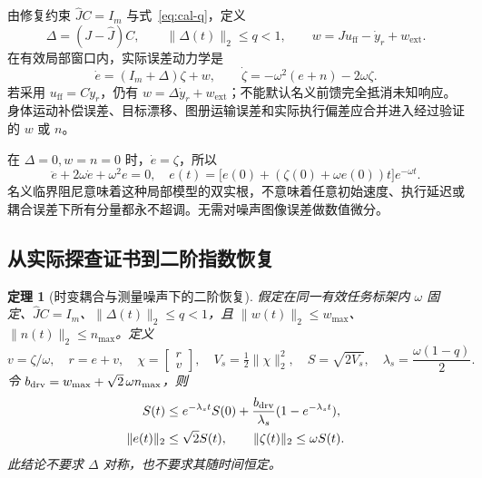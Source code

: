 \documentclass[11pt,a4paper]{article}
\numberwithin{equation}{section}
\newtheorem{theorem}{定理}[section]
\theoremstyle{definition}
\begin{document}
由修复约束 $\widehat JC=I_m$ 与式~\eqref{eq:cal-q}，定义
\begin{equation}
 \Delta=(J-\widehat J)C,\qquad
 \|\Delta(t)\|_2\le q<1,
 \qquad
 w=Ju_{\mathrm{ff}}-\dot y_r+w_{\mathrm{ext}}.
 \label{eq:cal-feedback-residual}
\end{equation}
在有效局部窗口内，实际误差动力学是
\begin{equation}
 \boxed{\dot e=(I_m+\Delta)\zeta+w,\qquad
 \dot\zeta=-\omega^2(e+n)-2\omega\zeta.}
 \label{eq:cal-error-dynamics}
\end{equation}
若采用 $u_{\mathrm{ff}}=C\dot y_r$，仍有 $w=\Delta\dot y_r+w_{\mathrm{ext}}$；不能默认名义前馈完全抵消未知响应。身体运动补偿误差、目标漂移、图册运输误差和实际执行偏差应合并进入经过验证的 $w$ 或 $n$。

在 $\Delta=0,w=n=0$ 时，$\dot e=\zeta$，所以
\begin{equation}
 \ddot e+2\omega\dot e+\omega^2e=0,
 \quad
 e(t)=\bigl[e(0)+(\zeta(0)+\omega e(0))t\bigr]e^{-\omega t}.
 \label{eq:cal-nominal-second-order}
\end{equation}
名义临界阻尼意味着这种局部模型的双实根，不意味着任意初始速度、执行延迟或耦合误差下所有分量都永不超调。无需对噪声图像误差做数值微分。

\subsection{从实际探查证书到二阶指数恢复}

\begin{theorem}[时变耦合与测量噪声下的二阶恢复]
\label{thm:cal-recovery}
假定在同一有效任务标架内 $\omega$ 固定、$\widehat JC=I_m$、$\|\Delta(t)\|_2\le q<1$，且
$\|w(t)\|_2\le w_{\max}$、$\|n(t)\|_2\le n_{\max}$。定义
\begin{equation}
 v=\zeta/\omega,\quad r=e+v,\quad
 \chi=\begin{bmatrix}r\\v\end{bmatrix},\quad
 V_s=\tfrac12\|\chi\|_2^2,\quad S=\sqrt{2V_s},
 \quad \lambda_s=\frac{\omega(1-q)}2.
 \label{eq:cal-servo-energy}
\end{equation}
令 $b_{\rm drv}=w_{\max}+\sqrt2\,\omega n_{\max}$，则
\begin{equation}
 \begin{aligned}
 S(t)&\le e^{-\lambda_st}S(0)
       +\frac{b_{\rm drv}}{\lambda_s}(1-e^{-\lambda_st}),\\
 \|e(t)\|_2&\le\sqrt2S(t),\qquad
 \|\zeta(t)\|_2\le\omega S(t).
 \end{aligned}
 \label{eq:cal-continuous-tube}
\end{equation}
此结论不要求 $\Delta$ 对称，也不要求其随时间恒定。
\end{theorem}
\end{document}
